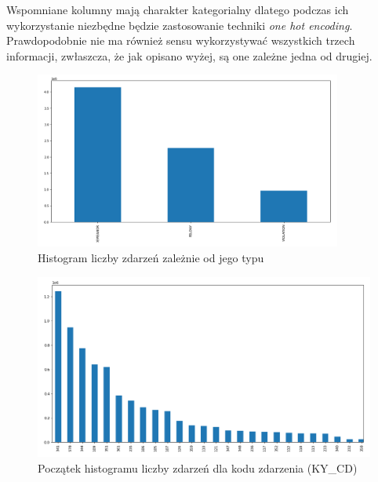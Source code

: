 \documentclass{classrep}
\begin{document}
{{{                Wspomniane kolumny mają charakter kategorialny dlatego podczas ich wykorzystanie niezbędne będzie zastosowanie techniki \emph{one hot encoding}. Prawdopodobnie nie ma również sensu wykorzystywać wszystkich trzech informacji, zwłaszcza, że jak opisano wyżej, są one zależne jedna od drugiej.
                
                \begin{figure}[!htbp]
                    \centering
                    \includegraphics[width=0.9\textwidth]{img/hist_law_cat_cd.png}
                    \caption{Histogram liczby zdarzeń zależnie od jego typu}
                    \label{hist_law_breaking_level}
                \end{figure}
                \begin{figure}[!htbp]
                    \centering
                    \includegraphics[width=\textwidth]{img/hist_ky_cd.png}
                    \caption{Początek histogramu liczby zdarzeń dla kodu zdarzenia (KY\_CD)}
                    \label{hist_ky_cd}
                \end{figure}
                \begin{figure}[!htbp]
                    \centering

\end{figure}}}}
\end{document}
